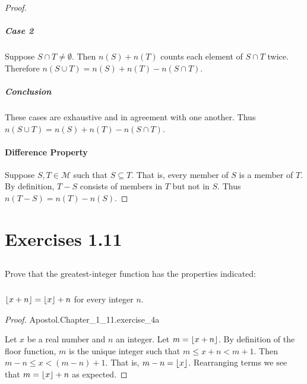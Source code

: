 \documentclass{report}
\begin{document}
\begin{proof}
    \subparagraph{Case 2}%

      Suppose $S \cap T \neq \emptyset$.
      Then $n(S) + n(T)$ counts each element of $S \cap T$ twice.
      Therefore $n(S \cup T) = n(S) + n(T) - n(S \cap T)$.

    \subparagraph{Conclusion}%

      These cases are exhaustive and in agreement with one another.
      Thus $n(S \cup T) = n(S) + n(T) - n(S \cap T)$.

  \paragraph{Difference Property}%

    Suppose $S, T \in \mathscr{M}$ such that $S \subseteq T$.
    That is, every member of $S$ is a member of $T$.
    By definition, $T - S$ consists of members in $T$ but not in $S$.
    Thus $n(T - S) = n(T) - n(S)$.

\end{proof}

\section{Exercises 1.11}%
\label{sec:exercises-1-11}

\subsection{}%
\label{sub:exercise-1.11.4}

Prove that the greatest-integer function has the properties indicated:

\subsubsection{}%
\label{ssub:exercise-1.11.4a}

$\left\lfloor x + n\right\rfloor = \left\lfloor x\right\rfloor + n$ for every integer $n$.

\begin{proof}

    {Apostol.Chapter\_1\_11.exercise\_4a}

  Let $x$ be a real number and $n$ an integer.
  Let $m = \left\lfloor x + n\right\rfloor$.
  By definition of the floor function, $m$ is the unique integer such that
    $m \leq x + n < m + 1$.
  Then $m - n \leq x < (m - n) + 1$.
  That is, $m - n = \left\lfloor x\right\rfloor$.
  Rearranging terms we see that $m = \left\lfloor x\right\rfloor + n$ as expected.

\end{proof}
\end{document}
